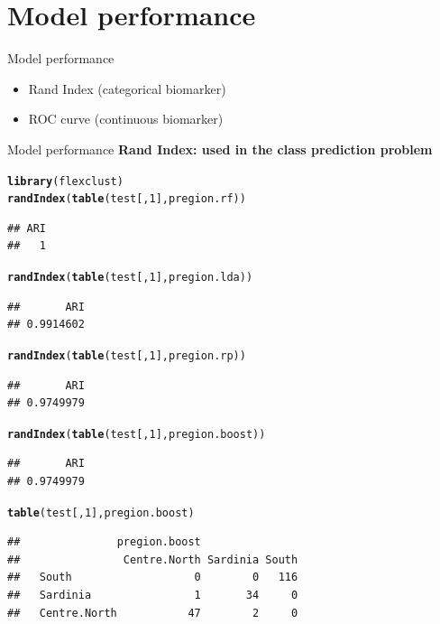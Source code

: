 \documentclass[10pt,xcolor=dvipsnames]{beamer}\usepackage[]{graphicx}\usepackage[]{color}
\makeatletter
\newcommand{\hlnum}[1]{\textcolor[rgb]{0.686,0.059,0.569}{#1}}%
\newcommand{\hlstd}[1]{\textcolor[rgb]{0.345,0.345,0.345}{#1}}%
\newcommand{\hlkwd}[1]{\textcolor[rgb]{0.737,0.353,0.396}{\textbf{#1}}}%
\newenvironment{kframe}{%
 \def\at@end@of@kframe{}%
 \ifinner\ifhmode%
  \def\at@end@of@kframe{\end{minipage}}%
  \begin{minipage}{\columnwidth}%
 \fi\fi%
 \def\FrameCommand##1{\hskip\@totalleftmargin \hskip-\fboxsep
 \colorbox{shadecolor}{##1}\hskip-\fboxsep
     \hskip-\linewidth \hskip-\@totalleftmargin \hskip\columnwidth}%
 \MakeFramed {\advance\hsize-\width
   \@totalleftmargin\z@ \linewidth\hsize
   \@setminipage}}%
 {\par\unskip\endMakeFramed%
 \at@end@of@kframe}
\newenvironment{knitrout}{}{} %
\makeatother
\begin{document}
\section{Model performance}

\begin{frame}[fragile]{Model performance}
 \begin{itemize}
   \item Rand Index (categorical biomarker)
   \item ROC curve (continuous biomarker)
 \end{itemize}
\end{frame}




\begin{frame}[fragile]{Model performance}
\textbf{Rand Index: used in the class prediction problem}
\begin{knitrout}\footnotesize
{}\color{fgcolor}\begin{kframe}
\begin{alltt}
\hlkwd{library}\hlstd{(flexclust)}
\hlkwd{randIndex}\hlstd{(}\hlkwd{table}\hlstd{(test[,}\hlnum{1}\hlstd{], pregion.rf))}
\end{alltt}
\begin{verbatim}
## ARI 
##   1
\end{verbatim}
\begin{alltt}
\hlkwd{randIndex}\hlstd{(}\hlkwd{table}\hlstd{(test[,}\hlnum{1}\hlstd{], pregion.lda))}
\end{alltt}
\begin{verbatim}
##       ARI 
## 0.9914602
\end{verbatim}
\begin{alltt}
\hlkwd{randIndex}\hlstd{(}\hlkwd{table}\hlstd{(test[,}\hlnum{1}\hlstd{], pregion.rp))}
\end{alltt}
\begin{verbatim}
##       ARI 
## 0.9749979
\end{verbatim}
\begin{alltt}
\hlkwd{randIndex}\hlstd{(}\hlkwd{table}\hlstd{(test[,}\hlnum{1}\hlstd{], pregion.boost))}
\end{alltt}
\begin{verbatim}
##       ARI 
## 0.9749979
\end{verbatim}
\begin{alltt}
\hlkwd{table}\hlstd{(test[,}\hlnum{1}\hlstd{], pregion.boost)}
\end{alltt}
\begin{verbatim}
##               pregion.boost
##                Centre.North Sardinia South
##   South                   0        0   116
##   Sardinia                1       34     0
##   Centre.North           47        2     0
\end{verbatim}
\end{kframe}
\end{knitrout}
\end{frame}
\end{document}
